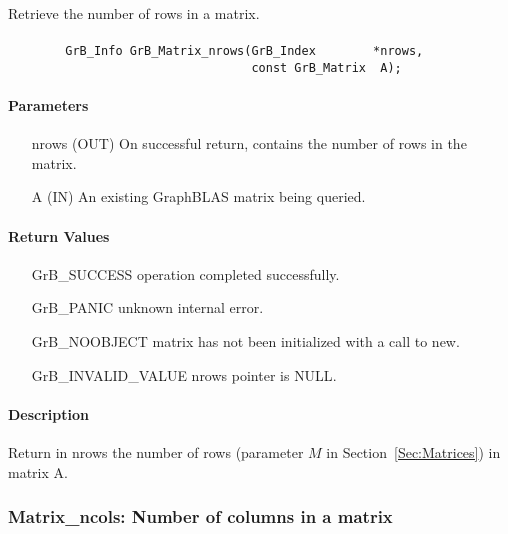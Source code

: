 Retrieve the number of rows in a matrix.

\paragraph{\syntax}

\begin{verbatim}
        GrB_Info GrB_Matrix_nrows(GrB_Index        *nrows,
                                  const GrB_Matrix  A);
\end{verbatim}

\paragraph{Parameters}

\begin{itemize}[leftmargin=1.1in]
    \item[{\sf nrows}] ({\sf OUT}) On successful return, contains the number of rows in the matrix.
    \item[{\sf A}] ({\sf IN}) An existing GraphBLAS matrix being queried.
\end{itemize}


\paragraph{Return Values}

\begin{itemize}[leftmargin=2.1in]
\item[{\sf GrB\_SUCCESS}]   operation completed successfully.
\item[{\sf GrB\_PANIC}]     unknown internal error.
\item[{\sf GrB\_NOOBJECT}]  matrix has not been initialized with a call to {\sf new}.
\item[{\sf GrB\_INVALID\_VALUE}]    {\sf nrows} pointer is {\sf NULL}.
\end{itemize}

\paragraph{Description}

Return in {\sf nrows} the number of rows (parameter $M$ in Section~\ref{Sec:Matrices}) in matrix {\sf A}.

\subsubsection{{\sf Matrix\_ncols}: Number of columns in a matrix}

